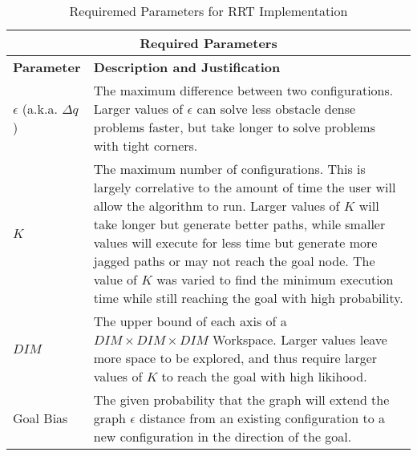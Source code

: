 \begin{table}[H]
\begin{center}
\begin{tabular}{|p{.2\linewidth}|p{.74\linewidth}|}
    \hline
    \multicolumn{2}{|c|}{\textbf{Required Parameters}} \\
    \hline
    \textbf{Parameter}   & \textbf{Description and Justification} \\
    \hline
    $\epsilon$ (a.k.a. $\Delta q$) & 
        The maximum difference between two configurations. Larger values of $\epsilon$ can solve less obstacle dense problems faster, but take longer to solve problems with tight corners.\\
    \hline
    $K$ &
        The maximum number of configurations. This is largely correlative to the amount of time the user will allow the algorithm to run. Larger values of $K$ will take longer but generate better paths, while smaller values will execute for less time but generate more jagged paths or may not reach the goal node. The value of $K$ was varied to find the minimum execution time while still reaching the goal with high probability. \\
    \hline
    $DIM$ &
        The upper bound of each axis of a $DIM\times DIM\times DIM$ Workspace. Larger values leave more space to be explored, and thus require larger values of $K$ to reach the goal with high likihood. \\
    \hline
    Goal Bias &
        The given probability that the graph will extend the graph $\epsilon$ distance from an existing configuration to a new configuration in the direction of the goal. \\
    \hline
\end{tabular}
\caption{Requiremed Parameters for \gls{RRT} Implementation}
\label{table:RRT_Tech_Specs_Parameters}
\end{center}
\end{table}